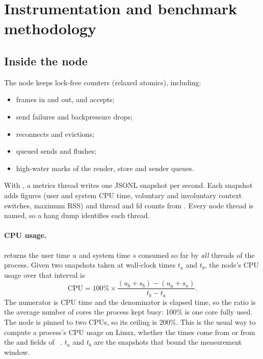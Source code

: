 \section{Instrumentation and benchmark methodology}
\label{sec:method}

\subsection{Inside the node}

The node keeps lock-free counters (relaxed atomics), including:
\begin{itemize}
  \item frames in and out, and accepts;
  \item send failures and backpressure drops;
  \item reconnects and evictions;
  \item queued sends and flushes;
  \item high-water marks of the render, store and sender queues.
\end{itemize}
With , a metrics thread writes one JSONL snapshot per second. Each
snapshot adds  figures (user and system CPU time, voluntary and
involuntary context switches, maximum RSS) and thread and fd counts from
. Every node thread is named, so a hang dump identifies each thread.

\paragraph{CPU usage.}  returns the user time
$u$ and system time $s$ consumed so far by \emph{all} threads of the process. Given
two snapshots taken at wall-clock times $t_a$ and $t_b$, the node's CPU usage over
that interval is
\begin{equation}
\mathrm{CPU} = 100\% \times \frac{(u_b + s_b) - (u_a + s_a)}{t_b - t_a}.
\label{eq:cpu}
\end{equation}
The numerator is CPU time and the denominator is elapsed time, so the ratio is the
average number of cores the process kept busy: 100\% is one core fully used. The node
is pinned to two CPUs, so its ceiling is 200\%. This is the usual way to compute a
process's CPU usage on Linux, whether the times come from  or from the
 and  fields of ~\cite{poll,so-cpu}.
$t_a$ and $t_b$ are the snapshots that bound the measurement window.

